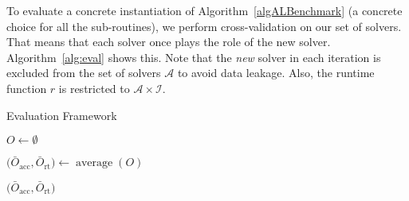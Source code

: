 \documentclass[runningheads]{llncs}
\begin{document}
To evaluate a concrete instantiation of Algorithm~\ref{algALBenchmark} (a concrete choice for all the sub-routines), we perform cross-validation on our set of solvers.
That means that each solver once plays the role of the new solver.
Algorithm~\ref{alg:eval} shows this.
Note that the \emph{new} solver in each iteration is excluded from the set of solvers $\mathcal{A}$ to avoid data leakage.
Also, the runtime function $r$ is restricted to $\mathcal{A} \times \mathcal{I}$.

\begin{algorithm}[htb]
  \caption{Evaluation Framework}
  \label{alg:eval}

  \BlankLine

  $O \leftarrow \emptyset$
  \BlankLine


  \BlankLine
  $\bigl( \bar{O}_{\operatorname{acc}}, \bar{O}_{\operatorname{rt}} \bigr) \leftarrow \operatorname{average}(O)$ \;
  
  \BlankLine
  \Return $\bigl( \bar{O}_{\operatorname{acc}}, \bar{O}_{\operatorname{rt}} \bigr)$
\end{algorithm}
\end{document}
